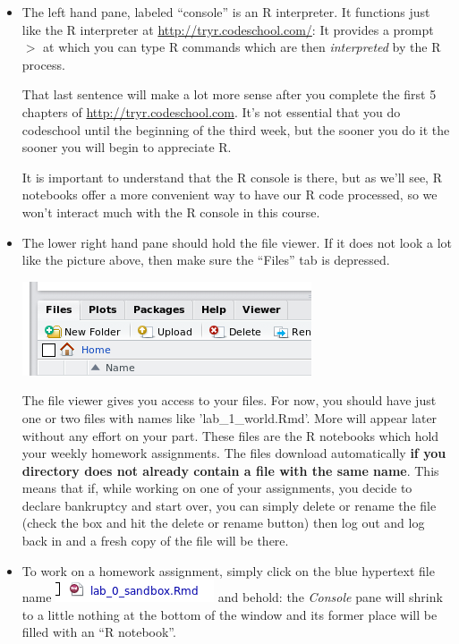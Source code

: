 \documentclass[11pt]{article}
\newcommand{\Rp}{$>$}
\begin{document}
\begin{itemize}
\item The left hand pane, labeled ``console''  is an R interpreter.  It functions just like the R interpreter at \url{http://tryr.codeschool.com/}: It provides a prompt \Rp{} at which you can type R commands which are then \emph{interpreted} by the R process.

That last sentence will make a lot more sense after you complete the first 5 chapters of  \url{http://tryr.codeschool.com}.  It's not essential that you do codeschool until the beginning of the third week, but the sooner you do it the sooner you will begin to appreciate R.

It is important to understand that the R console is there, but as we'll see, R notebooks offer a more convenient way to have our R code processed, so we won't interact much with the R console in this course.

\item The lower right hand pane should hold the file viewer. If it does not look a lot like the picture above, then make sure the ``Files'' tab is depressed.

\includegraphics[scale=.5]{RstudioFiles}

The file viewer gives you access to your files.  For now, you should have just one or two files with names like 'lab\_1\_world.Rmd'. More will appear later without any effort on your part.   These files are the R notebooks which hold your weekly homework assignments.  The files download automatically \textbf{if you directory does not already contain a file with the same name}.  This means that if, while working on one of your assignments, you decide to declare bankruptcy and start over, you can simply delete or rename the file (check the box and hit the delete or rename button) then log out and log back in and a fresh copy of the file will be there.

\item To work on a homework assignment, simply click on the blue hypertext file name
\includegraphics[scale=.5]{RstudioHyplink} and behold:  the \emph{Console} pane will shrink to a little nothing at the bottom of the window and its former place will be filled with an ``R notebook''.


\end{itemize}
\end{document}

